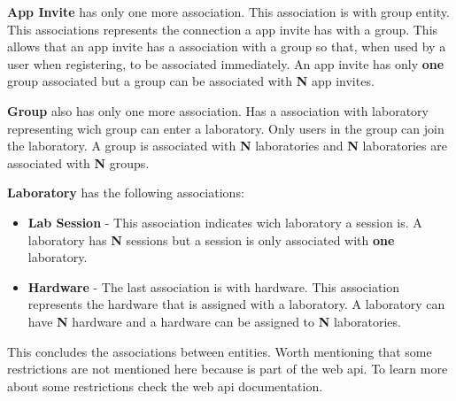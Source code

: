\documentclass[a4paper,twoside,11pt]{article}
\begin{document}
\textbf{App Invite} has only one more association. This association is with group entity. This associations represents the connection a app invite has with a group. This allows that an app invite has a association with a group so that, when used by a user when registering, to be associated immediately.
An app invite has only \textbf{one} group associated but a group can be associated with \textbf{N} app invites.

\textbf{Group} also has only one more association. Has a association with laboratory representing wich group can enter a laboratory. Only users in the group can join the laboratory. A group is associated with \textbf{N} laboratories and \textbf{N} laboratories are associated with \textbf{N} groups.

\textbf{Laboratory} has the following associations:
\begin{itemize}
    \item \textbf{Lab Session} - This association indicates wich laboratory a session is. A laboratory has \textbf{N} sessions but a session is only associated with \textbf{one} laboratory.
    \item \textbf{Hardware} - The last association is with hardware. This association represents the hardware that is assigned with a laboratory. A laboratory can have \textbf{N} hardware and a hardware can be assigned to \textbf{N} laboratories.
\end{itemize}

This concludes the associations between entities. Worth mentioning that some restrictions are not mentioned here because is part of the web api. To learn more about some restrictions check the web api documentation. 

\nocite{*}


\end{document}

